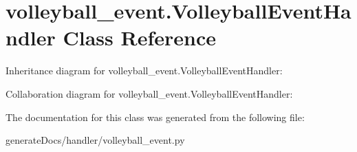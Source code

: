 \hypertarget{classvolleyball__event_1_1_volleyball_event_handler}{}\section{volleyball\+\_\+event.\+Volleyball\+Event\+Handler Class Reference}
\label{classvolleyball__event_1_1_volleyball_event_handler}


Inheritance diagram for volleyball\+\_\+event.\+Volleyball\+Event\+Handler\+:


Collaboration diagram for volleyball\+\_\+event.\+Volleyball\+Event\+Handler\+:


The documentation for this class was generated from the following file\+:\begin{DoxyCompactItemize}
\item 
generate\+Docs/handler/volleyball\+\_\+event.\+py\end{DoxyCompactItemize}
